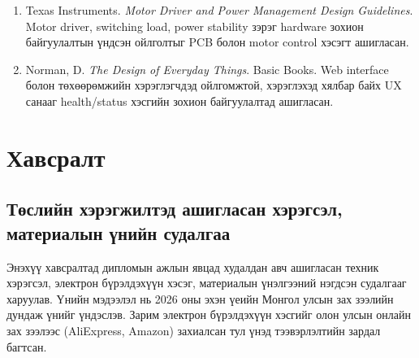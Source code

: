 \documentclass[12pt,a4paper]{report}
\begin{document}
\begin{enumerate}[leftmargin=1.2cm]
  \item Texas Instruments. \textit{Motor Driver and Power Management Design Guidelines}. Motor driver, switching load, power stability зэрэг hardware зохион байгуулалтын үндсэн ойлголтыг PCB болон motor control хэсэгт ашигласан.

  \item Norman, D. \textit{The Design of Everyday Things}. Basic Books. Web interface болон төхөөрөмжийн хэрэглэгчдэд ойлгомжтой, хэрэглэхэд хялбар байх UX санааг health/status хэсгийн зохион байгуулалтад ашигласан.
\end{enumerate}

\newpage
{}
\chapter*{Хавсралт}

\renewcommand{\thesection}{\Asbuk{section}}
\setcounter{section}{0}

\makeatletter
\def\Asbuk#1{\expandafter\@Asbuk\csname c@#1\endcsname}
\def\@Asbuk#1{%
  \ifcase#1\or А\or Б\or В\or Г\or Д\or Е\or Ё\or Ж\or З\or И\or К\or Л\or М\or Н\or О\or П\or Р\or С\or Т\or У\or Ф\or Х\or Ц\or Ч\or Ш\or Щ\or Э\or Ю\or Я\fi%
}
\makeatother

\section{Төслийн хэрэгжилтэд ашигласан хэрэгсэл, материалын үнийн судалгаа}

Энэхүү хавсралтад дипломын ажлын явцад худалдан авч ашигласан техник хэрэгсэл, электрон бүрэлдэхүүн хэсэг, материалын үнэлгээний нэгдсэн судалгааг харуулав. Үнийн мэдээлэл нь 2026 оны эхэн үеийн Монгол улсын зах зээлийн дундаж үнийг үндэслэв. Зарим электрон бүрэлдэхүүн хэсгийг олон улсын онлайн зах зээлээс (AliExpress, Amazon) захиалсан тул үнэд тээвэрлэлтийн зардал багтсан.
\end{document}
